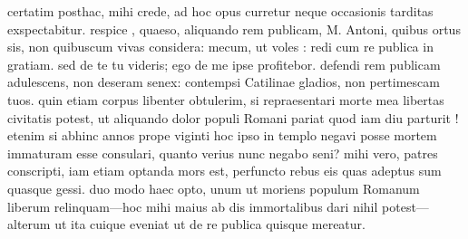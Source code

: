  certatim posthac, mihi crede, ad hoc opus curretur neque occasionis tarditas exspectabitur. respice , quaeso, aliquando rem publicam, M. Antoni, quibus ortus sis, non quibuscum vivas considera: mecum, ut voles : redi cum re publica in gratiam. sed de te tu videris; ego de me ipse profitebor. defendi rem publicam adulescens, non deseram senex: contempsi Catilinae gladios, non pertimescam tuos. quin etiam corpus libenter obtulerim, si repraesentari morte mea libertas civitatis potest, ut aliquando dolor populi Romani pariat quod iam diu parturit ! etenim si abhinc annos prope viginti hoc ipso in templo negavi posse mortem immaturam esse consulari, quanto verius nunc negabo seni? mihi vero, patres conscripti, iam etiam optanda mors est, perfuncto rebus eis quas adeptus sum quasque gessi. duo modo haec opto, unum ut moriens populum Romanum liberum relinquam—hoc mihi maius ab dis immortalibus dari nihil potest—alterum ut ita cuique eveniat ut de re publica quisque mereatur.
